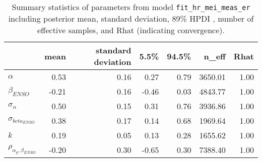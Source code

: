 \begin{table}[ht]
\centering
\begin{tabular}{lrrrrrr}
  \hline
 & mean & standard deviation & 5.5\% & 94.5\% & n\_eff & Rhat \\ 
  \hline
$\alpha$ & 0.53 & 0.16 & 0.27 & 0.79 & 3650.01 & 1.00 \\ 
  $\beta_{ENSO}$ & -0.21 & 0.16 & -0.46 & 0.03 & 4843.77 & 1.00 \\ 
  $\sigma_{\alpha}$ & 0.50 & 0.15 & 0.31 & 0.76 & 3936.86 & 1.00 \\ 
  $\sigma_{beta_{ENSO}}$ & 0.38 & 0.17 & 0.14 & 0.68 & 1969.64 & 1.00 \\ 
  $k$ & 0.19 & 0.05 & 0.13 & 0.28 & 1655.62 & 1.00 \\ 
  $\rho_{\alpha_g,\beta_{ENSO}}$ & -0.20 & 0.30 & -0.65 & 0.30 & 7388.40 & 1.00 \\ 
   \hline
\end{tabular}
\caption{Summary statistics of parameters from model \texttt{fit\_hr\_mei\_meas\_er} including posterior mean, standard deviation, 89\% HPDI , number of effective samples, and Rhat (indicating convergence).} 
\label{tab:precis_hr_mei_me}
\end{table}
